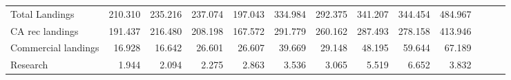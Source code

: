 \documentclass[11pt,
  english,
  a4paper,
]{article}
\begin{document}
\begin{table}
{\begin{tabular}[t]{lrrrrrrrrrrrr}
\hspace{1em}Total Landings & 210.310 & 235.216 & 237.074 & 197.043 & 334.984 & 292.375 & 341.207 & 344.454 & 484.967 &  &  & \\
\hspace{1em}CA rec landings & 191.437 & 216.480 & 208.198 & 167.572 & 291.779 & 260.162 & 287.493 & 278.158 & 413.946 &  &  & \\
\hspace{1em}Commercial landings & 16.928 & 16.642 & 26.601 & 26.607 & 39.669 & 29.148 & 48.195 & 59.644 & 67.189 &  &  & \\
\hspace{1em}Research & 1.944 & 2.094 & 2.275 & 2.863 & 3.536 & 3.065 & 5.519 & 6.652 & 3.832 &  &  & \\
\bottomrule
\end{tabular}}
\end{table}
\end{document}
